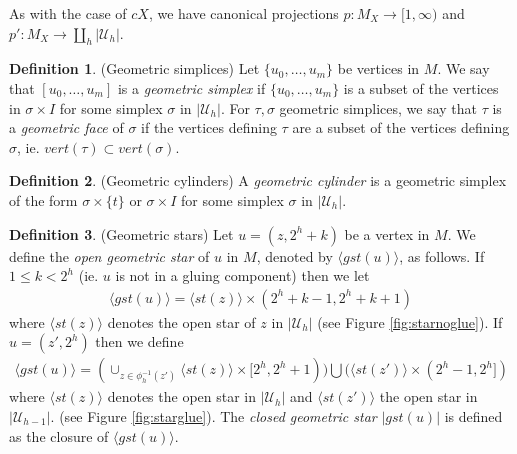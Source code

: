 \documentclass[a4paper,11pt]{article}
\theoremstyle{definition}
\newtheorem{definition}{Definition}[section]
\theoremstyle{plain}
\theoremstyle{remark}
\begin{document}
As with the case of $cX$, we have canonical projections $p: M_{X}\rightarrow [1,\infty)$ and $p': M_{X}\rightarrow \coprod_{h}|\mathcal{U}_{h}|$. \\


\begin{definition} (Geometric simplices) Let $\{u_0,\dots,u_m\}$ be vertices in $M$. We say that $[u_0,\dots, u_m]$ is a \textit{geometric simplex} if $\{u_{0},\dots,u_m\}$ is a subset of the vertices in $\sigma \times I$ for some simplex $\sigma$ in $|\mathcal{U}_{h}|$. For $\tau,\sigma$ geometric simplices, we say that $\tau$ is a \textit{geometric face} of $\sigma$ if the vertices defining $\tau$ are a subset of the vertices defining $\sigma$, ie. $vert(\tau)\subset vert (\sigma)$. 
\end{definition}

\begin{definition} (Geometric cylinders) A \textit{geometric cylinder} is a geometric simplex of the form $\sigma \times \{t\}$ or $\sigma \times I$ for some simplex $\sigma$ in $|\mathcal{U}_{h}|$. 
\end{definition}


\begin{definition} (Geometric stars) Let $u = (z, 2^h + k)$ be a vertex in $M$. We define the \textit{open geometric star} of $u$ in $M$, denoted by $\langle gst(u)\rangle$, as follows. If $1\leq k< 2^{h}$ (ie. $u$ is not in a gluing component) then we let
\begin{align*}
\langle gst(u)\rangle = \langle st(z)\rangle \times (2^h+k-1, 2^h + k+1)
\end{align*}
where $\langle st(z)\rangle$ denotes the open star of $z$ in $|\mathcal{U}_{h}|$ (see Figure \ref{fig:starnoglue}). If $u=(z',2^h)$ then we define
\begin{align*}
\langle gst(u)\rangle = (\cup_{z\in \phi_{h}^{-1}(z')} \langle st(z)\rangle \times [2^h, 2^h+1)) \bigcup (\langle st(z')\rangle \times (2^{h}-1,2^h])
\end{align*} 
where $\langle st(z)\rangle$ denotes the open star in $|\mathcal{U}_{h}|$ and $\langle st(z')\rangle$ the open star in $|\mathcal{U}_{h-1}|$. (see Figure \ref{fig:starglue}).  The \textit{closed geometric star} $|gst(u)|$ is defined as the closure of $\langle gst(u)\rangle$.
\end{definition}
\end{document}
